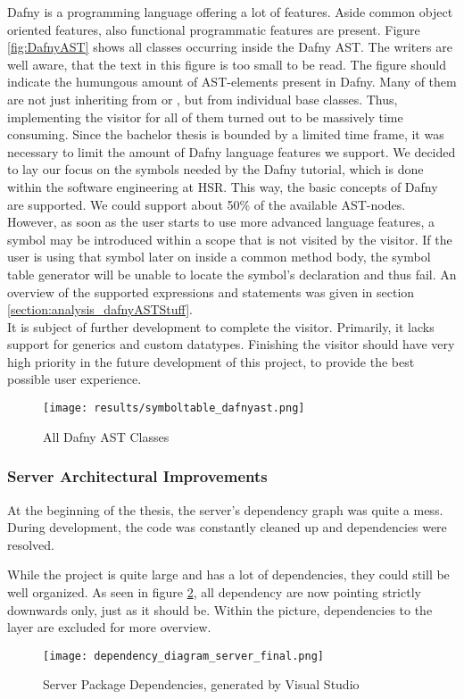 Dafny is a programming language offering a lot of features.
Aside common object oriented features, also functional programmatic features are present.
Figure \ref{fig:DafnyAST} shows all classes occurring inside the Dafny AST.
The writers are well aware, that the text in this figure is too small to be read.
The figure should indicate the humungous amount of AST-elements present in Dafny.
Many of them are not just inheriting from  or , but from individual base classes.
Thus, implementing the visitor for all of them turned out to be massively time consuming.
Since the bachelor thesis is bounded by a limited time frame, it was necessary to limit the amount of Dafny language features we support.
We decided to lay our focus on the symbols needed by the Dafny tutorial, which is done within the software engineering at HSR.
This way, the basic concepts of Dafny are supported.
We could support about 50\% of the available AST-nodes.
However, as soon as the user starts to use more advanced language features, a symbol may be introduced within a scope that is not visited by the visitor.
If the user is using that symbol later on inside a common method body, the symbol table generator will be unable to locate the symbol's declaration and thus fail.
An overview of the supported expressions and statements was given in section \ref{section:analysis_dafnyASTStuff}.\\

It is subject of further development to complete the visitor.
Primarily, it lacks support for generics and custom datatypes.
Finishing the visitor should have very high priority in the future development of this project,
to provide the best possible user experience.

\begin{figure}[H]
    \centering
    \texttt{[image: results/symboltable\_dafnyast.png]}
    \caption{All Dafny AST Classes}
    \label{fig:dafnyASTOverview}
\end{figure}

\subsubsection{Server Architectural Improvements}
At the beginning of the thesis, the server's dependency graph was quite a mess.
During development, the code was constantly cleaned up and dependencies were resolved.

While the project is quite large and has a lot of dependencies, they could still be well organized.
As seen in figure \ref{fig:dependency_graph_2}, all dependency are now pointing strictly downwards only, just as it should be.
Within the picture, dependencies to the  layer are excluded for more overview.
\begin{figure}[H]
    \centering
    \texttt{[image: dependency\_diagram\_server\_final.png]}
    \caption{Server Package Dependencies, generated by Visual Studio}
    \label{fig:dependency_graph_2}
\end{figure}

